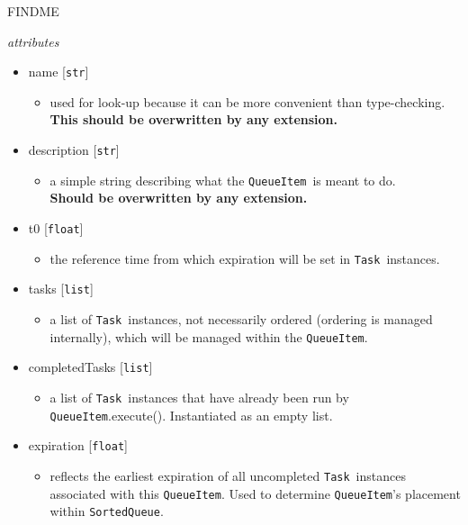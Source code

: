 \documentclass{article}
\newcommand{\SortedQueue}{\texttt{SortedQueue}}
\newcommand{\QueueItem}{\texttt{QueueItem}}
\newcommand{\Task}{\texttt{Task}}
\newcommand{\pythonfloat}{\texttt{float}}
\newcommand{\pythonstr}{\texttt{str}}
\newcommand{\pythonlist}{\texttt{list}}
\begin{document}
FINDME

\vspace{0.5cm}
\noindent
\textit{attributes}

\begin{itemize}
    \item{name [\pythonstr]
        \begin{itemize}
            \item{used for look-up because it can be more convenient than type-checking. \\ \textbf{This should be overwritten by any extension.}}
        \end{itemize}
         }
    \item{description [\pythonstr]
        \begin{itemize}
            \item{a simple string describing what the \QueueItem~is meant to do. \\ \textbf{Should be overwritten by any extension.}}
        \end{itemize}
         }
    \item{t0 [\pythonfloat]
        \begin{itemize}
            \item{the reference time from which expiration will be set in \Task~instances.}
        \end{itemize}
         }
    \item{tasks [\pythonlist]
        \begin{itemize}
            \item{a list of \Task~instances, not necessarily ordered (ordering is managed internally), which will be managed within the \QueueItem.}
        \end{itemize}
         }
    \item{completedTasks [\pythonlist]
        \begin{itemize}
            \item{a list of \Task~instances that have already been run by \QueueItem.execute(). Instantiated as an empty list.}
        \end{itemize}
         }
    \item{expiration [\pythonfloat]
        \begin{itemize}
            \item{reflects the earliest expiration of all uncompleted \Task~instances associated with this \QueueItem. Used to determine \QueueItem's placement within \SortedQueue.}
        \end{itemize}
         }
\end{itemize}
\end{document}
